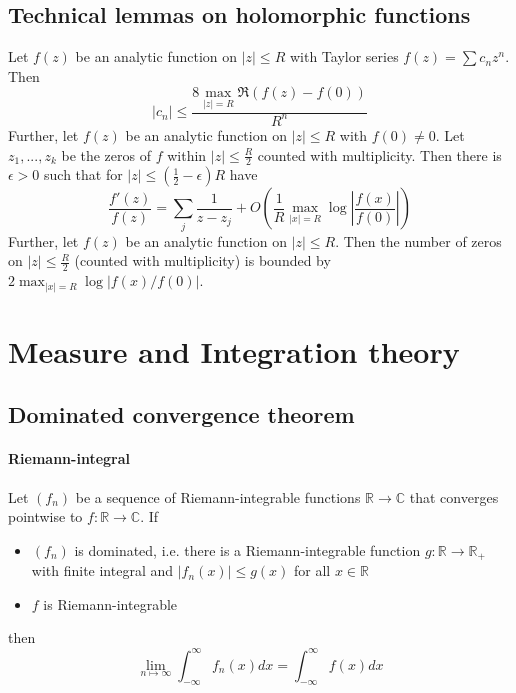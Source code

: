 \documentclass{scrartcl}
\newcommand{\R}{\mathbb{R}}
\newcommand{\C}{\mathbb{C}}
\begin{document}
\subsection{Technical lemmas on holomorphic functions}
\label{bounds_complex_analytic_functions}
Let $f(z)$ be an analytic function on $|z| \leq R$ with Taylor series $f(z) = \sum c_n z^n$. Then
\begin{equation*}
    |c_n| \leq \frac {8 \max_{|z| = R} \Re(f(z) - f(0))} {R^n}
\end{equation*}
Further, let $f(z)$ be an analytic function on $|z| \leq R$ with $f(0) \neq 0$.
Let $z_1, ..., z_k$ be the zeros of $f$ within $|z| \leq \frac R 2$ counted with multiplicity.
Then there is $\epsilon > 0$ such that for $|z| \leq (\frac 1 2 - \epsilon)R$ have
\begin{equation*}
    \frac {f'(z)} {f(z)} = \sum_j \frac 1 {z - z_j} + O\left( \frac 1 R \max_{|x| = R} \log\left| \frac {f(x)} {f(0)} \right| \right)
\end{equation*}
Further, let $f(z)$ be an analytic function on $|z| \leq R$.
Then the number of zeros on $|z| \leq \frac R 2$ (counted with multiplicity) is bounded by $2\max_{|x| = R} \log\left| f(x)/f(0) \right|$.

\section{Measure and Integration theory}

\subsection{Dominated convergence theorem}
\paragraph{Riemann-integral}
Let $(f_n)$ be a sequence of Riemann-integrable functions $\R \to \C$ that converges pointwise to $f: \R \to \C$. If
\begin{itemize}
    \item $(f_n)$ is dominated, i.e. there is a Riemann-integrable function $g: \R \to \R_+$ with finite integral and $|f_n(x)| \leq g(x)$ for all $x \in \R$
    \item $f$ is Riemann-integrable
\end{itemize}
then
\begin{equation*}
    \lim_{n \mapsto \infty} \int_{-\infty}^{\infty} f_n(x) dx = \int_{-\infty}^{\infty} f(x) dx
\end{equation*}
\end{document}
